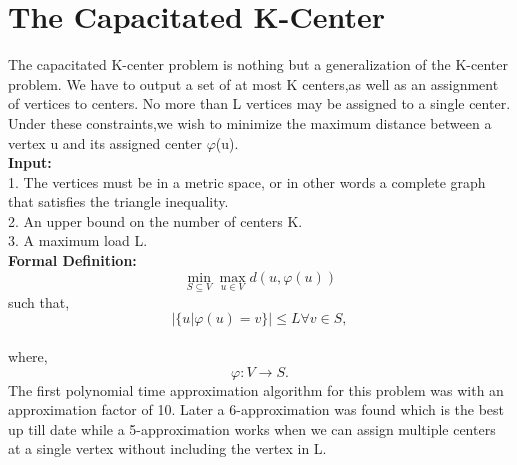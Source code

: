 \documentclass[12pt,a4paper,onecolumn]{article}
\begin{document}
\section{The Capacitated K-Center}
The capacitated K-center problem is nothing but a generalization of the K-center problem. We have to
output a set of at most K centers,as well as an assignment of vertices to centers. No more than L vertices may be assigned to a single center. Under these constraints,we
wish to minimize the maximum distance between a vertex u and its assigned center
$\varphi$(u). \\
\textbf{Input:}\\1. The vertices must be in a metric space, or in other words a complete graph that satisfies the triangle inequality.\\2. An
upper bound on the number of centers K.\\3. A maximum load L.\\\textbf{Formal Definition:}\\
$$ \min_{S \subseteq V}\max_{u \in V}d(u,\varphi(u)) $$such that,   $$|\{u|\varphi(u) = v\}|\leq L \forall v \in S,$$\\where,   $$\varphi : V \rightarrow S.$$
The first polynomial time approximation
algorithm for this problem was with an approximation factor of 10. Later a 6-approximation was found which is the best up till date while a 5-approximation works when we can assign multiple centers at a single vertex without including the vertex in L.
\end{document}
